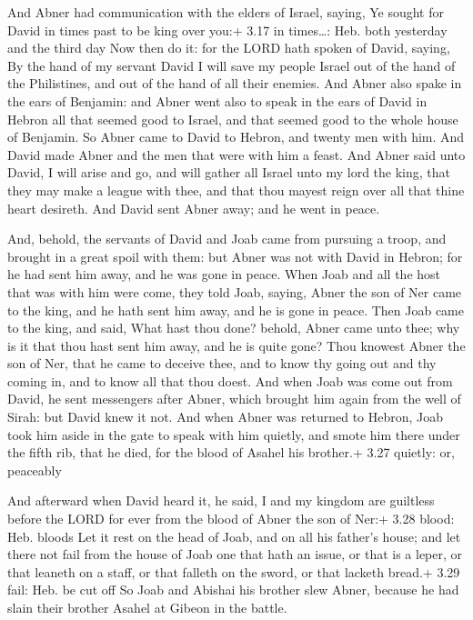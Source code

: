  And Abner had communication with the elders of Israel,
saying, Ye sought for David in times past to be king over you:+ 3.17 in
times\ldots: Heb. both yesterday and the third day  Now
then do it: for the LORD hath spoken of David, saying, By the hand of my
servant David I will save my people Israel out of the hand of the
Philistines, and out of the hand of all their enemies.  And
Abner also spake in the ears of Benjamin: and Abner went also to speak
in the ears of David in Hebron all that seemed good to Israel, and that
seemed good to the whole house of Benjamin.  So Abner came
to David to Hebron, and twenty men with him. And David made Abner and
the men that were with him a feast.  And Abner said unto
David, I will arise and go, and will gather all Israel unto my lord the
king, that they may make a league with thee, and that thou mayest reign
over all that thine heart desireth. And David sent Abner away; and he
went in peace.

 And, behold, the servants of David and Joab came from
pursuing a troop, and brought in a great spoil with them: but Abner was
not with David in Hebron; for he had sent him away, and he was gone in
peace.  When Joab and all the host that was with him were
come, they told Joab, saying, Abner the son of Ner came to the king, and
he hath sent him away, and he is gone in peace.  Then Joab
came to the king, and said, What hast thou done? behold, Abner came unto
thee; why is it that thou hast sent him away, and he is quite gone?
 Thou knowest Abner the son of Ner, that he came to deceive
thee, and to know thy going out and thy coming in, and to know all that
thou doest.  And when Joab was come out from David, he sent
messengers after Abner, which brought him again from the well of Sirah:
but David knew it not.  And when Abner was returned to
Hebron, Joab took him aside in the gate to speak with him quietly, and
smote him there under the fifth rib, that he died, for the blood of
Asahel his brother.+ 3.27 quietly: or, peaceably

 And afterward when David heard it, he said, I and my
kingdom are guiltless before the LORD for ever from the blood of Abner
the son of Ner:+ 3.28 blood: Heb. bloods  Let it rest on
the head of Joab, and on all his father's house; and let there not fail
from the house of Joab one that hath an issue, or that is a leper, or
that leaneth on a staff, or that falleth on the sword, or that lacketh
bread.+ 3.29 fail: Heb. be cut off  So Joab and Abishai his
brother slew Abner, because he had slain their brother Asahel at Gibeon
in the battle.

